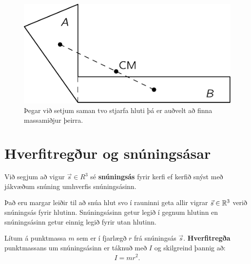\begin{figure}[H]
    \centering
    \includegraphics[scale=1]{figures/feyncm.pdf}
    \caption{Þegar við setjum saman tvo stjarfa hluti þá er auðvelt að finna massamiðjur þeirra.}
    \label{fig:feyncm}
\end{figure}


\section{Hverfitregður og snúningsásar}

\begin{tcolorbox}
\begin{definition}
Við segjum að vigur $\vec{s} \in R^3$ sé \textbf{snúningsás} fyrir kerfi ef kerfið snýst með jákvæðum snúning umhverfis snúningsásinn.
\end{definition}
\end{tcolorbox}

Það eru margar leiðir til að snúa hlut svo í rauninni geta allir vigrar $\vec{s} \in \mathbb{R}^3$ verið snúningsás fyrir hlutinn. Snúningsásinn getur legið í gegnum hlutinn en snúningsásinn getur einnig legið fyrir utan hlutinn. 

\begin{tcolorbox}
\begin{definition}
Lítum á punktmassa $m$ sem er í fjarlægð $r$ frá snúningsás $\vec{s}$. \textbf{Hverfitregða} punktmassans um snúningsásinn er táknuð með $I$ og skilgreind þannig að:
\begin{align*}
    I = mr^2.
\end{align*}
\end{definition}
\end{tcolorbox}

